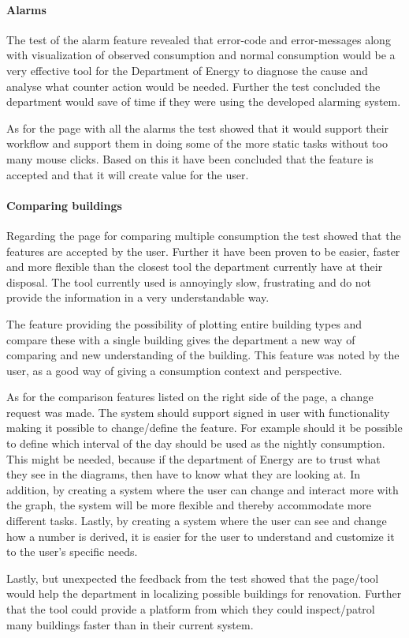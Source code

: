 \paragraph{Alarms}
The test of the alarm feature revealed that error-code and error-messages along with visualization of observed consumption and normal consumption would be a very effective tool for the Department of Energy to diagnose the cause and analyse what counter action would be needed. Further the test concluded the department would save of time if they were using the developed alarming system. 

As for the page with all the alarms the test showed that it would support their workflow and support them in doing some of the more static tasks without too many mouse clicks. Based on this it have been concluded that the feature is accepted and that it will create value for the user.
\paragraph{Comparing buildings}
Regarding the page for comparing multiple consumption the test showed that the features are accepted by the user. Further it have been proven to be easier, faster and more flexible than the closest tool the department currently have at their disposal. The tool currently used is annoyingly slow, frustrating and do not provide the information in a very understandable way. 

The feature providing the possibility of plotting entire building types and compare these with a single building gives the department a new way of comparing and new understanding of the building. This feature was noted by the user, as a good way of giving a consumption context and perspective. 

As for the comparison features listed on the right side of the page, a change request was made. The system should support signed in user with functionality making it possible to change/define the feature. For example should it be possible to define which interval of the day should be used as the nightly consumption. This might be needed, because if the department of Energy are to trust what they see in the diagrams, then have to know what they are looking at. In addition, by creating a system where the user can change and interact more with the graph, the system will be more flexible and thereby accommodate more different tasks. Lastly, by creating a system where the user can see and change how a number is derived, it is easier for the user to understand and customize it to the user's specific needs.

Lastly, but unexpected the feedback from the test showed that the page/tool would help the department in localizing possible buildings for renovation. Further that the tool could provide a platform from which they could inspect/patrol many buildings faster than in their current system.